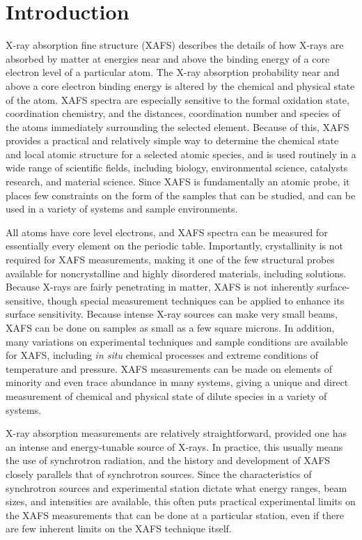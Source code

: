 \section{Introduction}

X-ray absorption fine structure (XAFS) describes the details of how X-rays
are absorbed by matter at energies near and above the binding energy of a
core electron level of a particular atom.  The X-ray absorption probability
near and above a core electron binding energy is altered by the chemical
and physical state of the atom.  XAFS spectra are especially sensitive to
the formal oxidation state, coordination chemistry, and the distances,
coordination number and species of the atoms immediately surrounding the
selected element.  Because of this, XAFS provides a practical and
relatively simple way to determine the chemical state and local atomic
structure for a selected atomic species, and is used routinely in a wide
range of scientific fields, including biology, environmental science,
catalysts research, and material science.  Since XAFS is fundamentally an
atomic probe, it places few constraints on the form of the samples that can
be studied, and can be used in a variety of systems and sample
environments.

All atoms have core level electrons, and XAFS spectra can be measured for
essentially every element on the periodic table.  Importantly,
crystallinity is not required for XAFS measurements, making it one of the
few structural probes available for noncrystalline and highly disordered
materials, including solutions.  Because X-rays are fairly penetrating in
matter, XAFS is not inherently surface-sensitive, though special
measurement techniques can be applied to enhance its surface sensitivity.
Because intense X-ray sources can make very small beams, XAFS can be done
on samples as small as a few square microns.  In addition, many variations
on experimental techniques and sample conditions are available for XAFS,
including {\emph{in situ}} chemical processes and extreme conditions of
temperature and pressure.  XAFS measurements can be made on elements of
minority and even trace abundance in many systems, giving a unique and
direct measurement of chemical and physical state of dilute species in a
variety of systems.

X-ray absorption measurements are relatively straightforward, provided one
has an intense and energy-tunable source of X-rays. In practice, this
usually means the use of synchrotron radiation, and the history and
development of XAFS closely parallels that of synchrotron sources.  Since
the characteristics of synchrotron sources and experimental station dictate
what energy ranges, beam sizes, and intensities are available, this often
puts practical experimental limits on the XAFS measurements that can be
done at a particular station, even if there are few inherent limits on the
XAFS technique itself.

